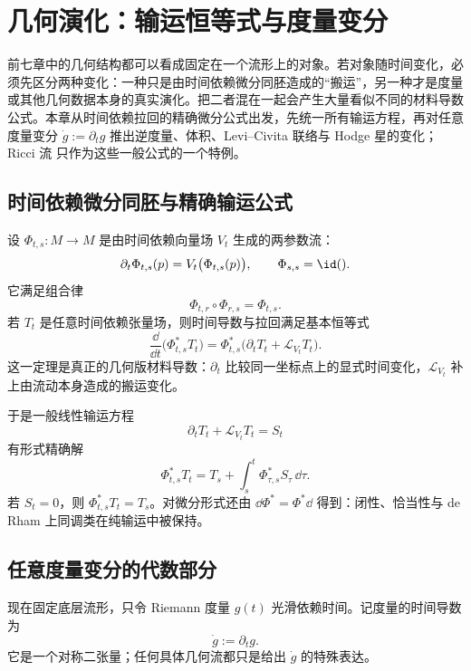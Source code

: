 \chapter{几何演化：输运恒等式与度量变分}

前七章中的几何结构都可以看成固定在一个流形上的对象。若对象随时间变化，必须先区分两种变化：一种只是由时间依赖微分同胚造成的“搬运”，另一种才是度量或其他几何数据本身的真实演化。把二者混在一起会产生大量看似不同的材料导数公式。本章从时间依赖拉回的精确微分公式出发，先统一所有输运方程，再对任意度量变分 $\dot g:=\partial_tg$ 推出逆度量、体积、Levi--Civita 联络与 Hodge 星的变化；Ricci 流 只作为这些一般公式的一个特例。

\section{时间依赖微分同胚与精确输运公式}

设 $\Phi_{t,s}:M\to M$ 是由时间依赖向量场 $V_t$ 生成的两参数流：
\begin{equation*}\partial_t\Phi_{t,s}(p)
=V_t\bigl(\Phi_{t,s}(p)\bigr),
\qquad
\Phi_{s,s}=\id().
\end{equation*}
它满足组合律
\[
\Phi_{t,r}\circ\Phi_{r,s}=\Phi_{t,s}.
\]
若 $T_t$ 是任意时间依赖张量场，则时间导数与拉回满足基本恒等式
\begin{equation}\label{eq:math-dg-transport-identity}
\boxed{
\frac{\dd}{\dd t}\bigl(\Phi_{t,s}^*T_t\bigr)
=\Phi_{t,s}^*
\bigl(\partial_tT_t+\mathcal L_{V_t}T_t\bigr).}
\end{equation}
这一定理是真正的几何版材料导数：$\partial_t$ 比较同一坐标点上的显式时间变化，$\mathcal L_{V_t}$ 补上由流动本身造成的搬运变化。

于是一般线性输运方程
\begin{equation*}\partial_tT_t+\mathcal L_{V_t}T_t=S_t
\end{equation*}
有形式精确解
\begin{equation}\label{eq:math-dg-geometric-transport-solution}
\boxed{
\Phi_{t,s}^*T_t
=T_s+\int_s^t\Phi_{\tau,s}^*S_\tau\,\dd\tau.}
\end{equation}
若 $S_t=0$，则 $\Phi_{t,s}^*T_t=T_s$。对微分形式还由 $\dd\Phi^*=\Phi^*\dd$ 得到：闭性、恰当性与 de Rham 上同调类在纯输运中被保持。

\section{任意度量变分的代数部分}

现在固定底层流形，只令 Riemann 度量 $g(t)$ 光滑依赖时间。记度量的时间导数为
\begin{equation*}\dot g:=\partial_tg.
\end{equation*}
它是一个对称二张量；任何具体几何流都只是给出 $\dot g$ 的特殊表达。

